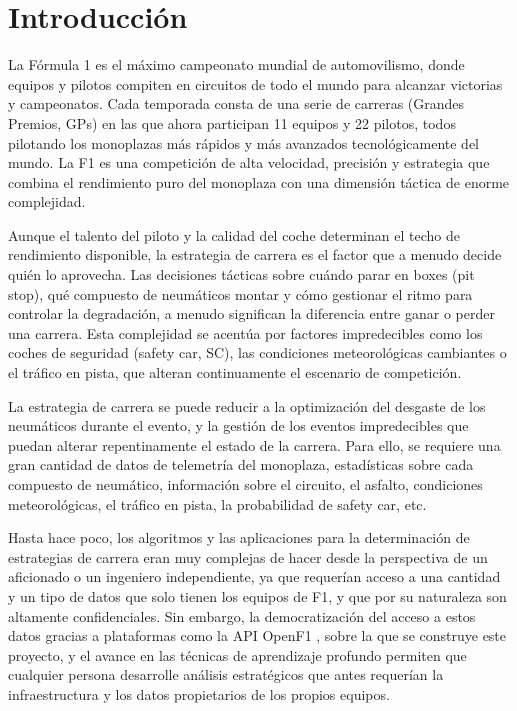 
\chapter{Introducción}
\label{cap:introduccion}

La Fórmula 1 es el máximo campeonato mundial de automovilismo, donde equipos y pilotos compiten en circuitos de todo el mundo para alcanzar victorias y campeonatos. Cada temporada consta de una serie de carreras (Grandes Premios, GPs) en las que ahora participan 11 equipos y 22 pilotos, todos pilotando los monoplazas más rápidos y más avanzados tecnológicamente del mundo. La F1 es una competición de alta velocidad, precisión y estrategia que combina el rendimiento puro del monoplaza con una dimensión táctica de enorme complejidad.

Aunque el talento del piloto y la calidad del coche determinan el techo de rendimiento disponible, la estrategia de carrera es el factor que a menudo decide quién lo aprovecha. Las decisiones tácticas sobre cuándo parar en boxes (pit stop), qué compuesto de neumáticos montar y cómo gestionar el ritmo para controlar la degradación, a menudo significan la diferencia entre ganar o perder una carrera. Esta complejidad se acentúa por factores impredecibles como los coches de seguridad (safety car, SC), las condiciones meteorológicas cambiantes o el tráfico en pista, que alteran continuamente el escenario de competición.

La estrategia de carrera se puede reducir a la optimización del desgaste de los neumáticos durante el evento, y la gestión de los eventos impredecibles que puedan alterar repentinamente el estado de la carrera. Para ello, se requiere una gran cantidad de datos de telemetría del monoplaza, estadísticas sobre cada compuesto de neumático, información sobre el circuito, el asfalto, condiciones meteorológicas, el tráfico en pista, la probabilidad de safety car, etc.

Hasta hace poco, los algoritmos y las aplicaciones para la determinación de estrategias de carrera eran muy complejas de hacer desde la perspectiva de un aficionado o un ingeniero independiente, ya que requerían acceso a una cantidad y un tipo de datos que solo tienen los equipos de F1, y que por su naturaleza son altamente confidenciales. Sin embargo, la democratización del acceso a estos datos gracias a plataformas como la API OpenF1 \cite{openf1api}, sobre la que se construye este proyecto, y el avance en las técnicas de aprendizaje profundo permiten que cualquier persona desarrolle análisis estratégicos que antes requerían la infraestructura y los datos propietarios de los propios equipos.

